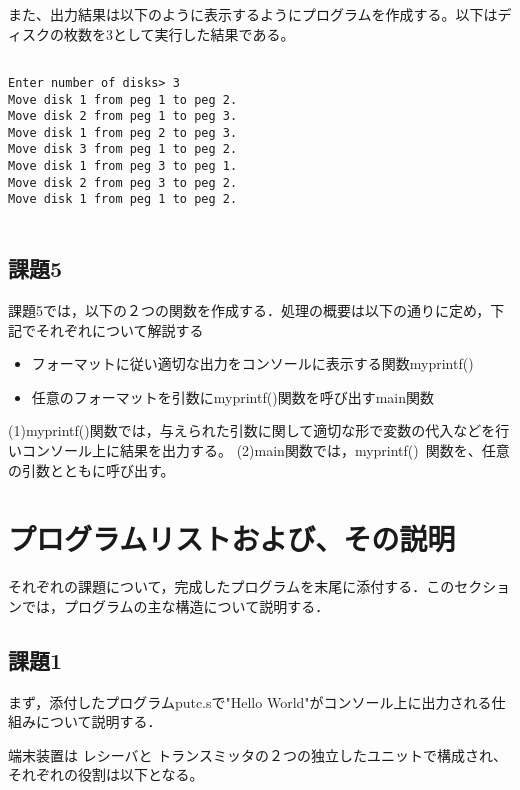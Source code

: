 \documentclass[a4j]{jarticle}
\begin{document}
また、出力結果は以下のように表示するようにプログラムを作成する。以下はディスクの枚数を3として実行した結果である。

{\baselineskip 3mm
\begin{verbatim}

Enter number of disks> 3
Move disk 1 from peg 1 to peg 2.
Move disk 2 from peg 1 to peg 3.
Move disk 1 from peg 2 to peg 3.
Move disk 3 from peg 1 to peg 2.
Move disk 1 from peg 3 to peg 1.
Move disk 2 from peg 3 to peg 2.
Move disk 1 from peg 1 to peg 2.
 
\end{verbatim}
}



\subsection{課題5}

課題5では，以下の２つの関数を作成する．処理の概要は以下の通りに定め，下記でそれぞれについて解説する

\begin{itemize}
\item[(1)]フォーマットに従い適切な出力をコンソールに表示する関数myprintf()
\item[(2)]任意のフォーマットを引数にmyprintf()関数を呼び出すmain関数
\end{itemize}


(1)myprintf()関数では，与えられた引数に関して適切な形で変数の代入などを行いコンソール上に結果を出力する。
(2)main関数では，myprintf() 関数を、任意の引数とともに呼び出す。



%
%

\section{プログラムリストおよび、その説明}

それぞれの課題について，完成したプログラムを末尾に添付する．このセクションでは，プログラムの主な構造について説明する．

\subsection{課題1}

まず，添付したプログラムputc.sで"Hello World"がコンソール上に出力される仕組みについて説明する．

端末装置は レシーバと トランスミッタの２つの独立したユニットで構成され、それぞれの役割は以下となる。
\end{document}
